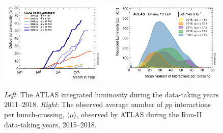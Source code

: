 \begin{figure}[!htb]
    \begin{center}
        \includegraphics[width=0.49\textwidth]{figures/chapter2/int_lumi_multiyear}
        \includegraphics[width=0.49\textwidth]{figures/chapter2/mu_run2}
        \caption{
            \textit{Left}: The ATLAS integrated luminosity during the data-taking years 2011--2018.
            \textit{Right}: The observed average number of $pp$ interactions per bunch-crossing, $\langle \mu \rangle$,
                observed by ATLAS during the Run-II data-taking years, 2015--2018.
        }
        \label{fig:int_lumi_multiyear}
    \end{center}
\end{figure}
